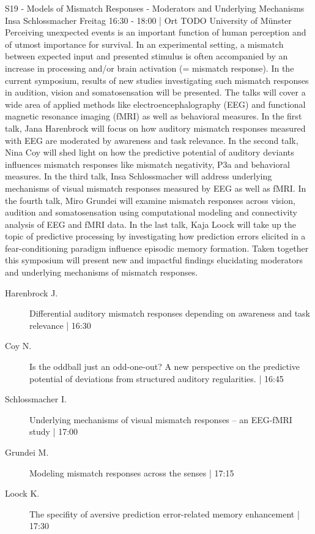 
            \begin{symposium}
            {S19 - Models of Mismatch Responses - Moderators and Underlying Mechanisms}
            {Insa Schlossmacher}
            {Freitag 16:30 - 18:00 | Ort TODO}
            {University of Münster}
            Perceiving unexpected events is an important function of human perception and of utmost importance for survival. In an experimental setting, a mismatch between expected input and presented stimulus is often accompanied by an increase in processing and/or brain activation (= mismatch response). In the current symposium, results of new studies investigating such mismatch responses in audition, vision and somatosensation will be presented. The talks will cover a wide area of applied methods like electroencephalography (EEG) and functional magnetic resonance imaging (fMRI) as well as behavioral measures. In the first talk, Jana Harenbrock will focus on how auditory mismatch responses measured with EEG are moderated by awareness and task relevance. In the second talk, Nina Coy will shed light on how the predictive potential of auditory deviants influences mismatch responses like mismatch negativity, P3a and behavioral measures. In the third talk, Insa Schlossmacher will address underlying mechanisms of visual mismatch responses measured by EEG as well as fMRI. In the fourth talk, Miro Grundei will examine mismatch responses across vision, audition and somatosensation using computational modeling and connectivity analysis of EEG and fMRI data. In the last talk, Kaja Loock will take up the topic of predictive processing by investigating how prediction errors elicited in a fear-conditioning paradigm influence episodic memory formation. Taken together this symposium will present new and impactful findings elucidating moderators and underlying mechanisms of mismatch responses.
            \begin{description}    
            
                \item [ Harenbrock J.] Differential auditory mismatch responses depending on awareness and task relevance \textcolor{mygray}{ | 16:30}    
                
                \item [ Coy N.] Is the oddball just an odd-one-out? A new perspective on the predictive potential of deviations from structured auditory regularities. \textcolor{mygray}{ | 16:45}    
                
                \item [ Schlossmacher I.] Underlying mechanisms of visual mismatch responses – an EEG-fMRI study \textcolor{mygray}{ | 17:00}    
                
                \item [ Grundei M.] Modeling mismatch responses across the senses \textcolor{mygray}{ | 17:15}    
                
                \item [ Loock K.] The specifity of aversive prediction error-related memory enhancement \textcolor{mygray}{ | 17:30}    
                
            \end{description} 
            \end{symposium}
            